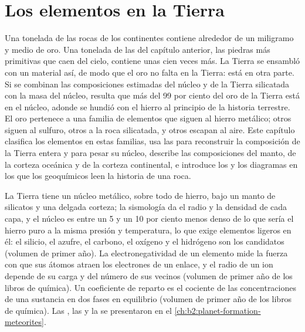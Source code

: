 \chapter{Los elementos en la Tierra}\label{ch:b2:elements-in-the-earth}

Una tonelada de las rocas de los continentes contiene alrededor de un miligramo y medio de
oro. Una tonelada de las  del capítulo anterior, las piedras más
primitivas que caen del cielo, contiene unas cien veces más. La
Tierra se ensambló con un material así, de modo que el oro no falta en la
Tierra: está en otra parte. Si se combinan las composiciones estimadas del núcleo y de
la Tierra silicatada con la masa del núcleo, resulta que más del 99 por ciento del
oro de la Tierra está en el núcleo, adonde se hundió con el hierro al principio de
la historia terrestre. El oro pertenece a una familia de elementos que siguen al hierro
metálico; otros siguen al sulfuro, otros a la roca silicatada, y otros escapan
al aire. Este capítulo clasifica los elementos en estas familias, usa las
 para reconstruir la composición de la Tierra entera y para pesar su
núcleo, describe las composiciones del manto, de la corteza oceánica y de la
corteza continental, e introduce los  y los diagramas en los que
los geoquímicos leen la historia de una roca.

\begin{recall}
La Tierra tiene un núcleo metálico, sobre todo de hierro, bajo un manto de silicatos y una delgada
corteza; la sismología da el radio y la densidad de cada capa, y el núcleo
es entre un 5 y un 10 por ciento menos denso de lo que sería el hierro puro a la misma presión y
temperatura, lo que exige elementos ligeros en él: el silicio, el azufre, el carbono,
el oxígeno y el hidrógeno son los candidatos (volumen de primer año). La
electronegatividad de un elemento mide la fuerza con que sus átomos atraen los
electrones de un enlace, y el radio de un ion depende de su carga y del
número de sus vecinos (volumen de primer año de los libros de química). Un coeficiente
de reparto es el cociente de las concentraciones de una sustancia en dos fases en
equilibrio (volumen de primer año de los libros de química). Las , las  y la  se presentaron en el
\cref{ch:b2:planet-formation-meteorites}.
\end{recall}

